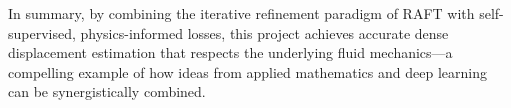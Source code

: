 \documentclass[11pt, a4paper]{article}
\begin{document}
In summary, by combining the iterative refinement paradigm of RAFT with self-supervised, physics-informed losses, this project achieves accurate dense displacement estimation that respects the underlying fluid mechanics---a compelling example of how ideas from applied mathematics and deep learning can be synergistically combined.

\printbibliography
\end{document}
